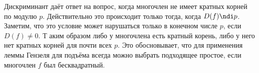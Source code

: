 Дискриминант даёт ответ на вопрос, когда многочлен не имеет кратных корней по модулю $p$. 
Действительно это происходит только тогда, когда $D(f)\ndi p$. 
Заметим, что это условие может нарушаться только в конечном числе $p$, если
$D(f)\neq 0$. Т аким образом либо у многочлена есть кратный корень, либо у него
нет кратных корней для почти всех $p$.  Это обосновывает, что для применения
леммы Гензеля для подъёма всегда можно выбрать подходящее простое, если
многочлен $f$ был бесквадратный.

